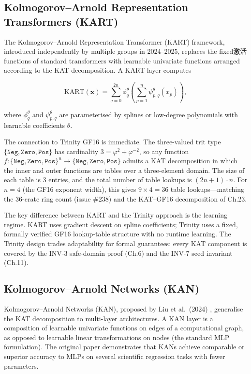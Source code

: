 \subsection{Kolmogorov--Arnold Representation
Transformers (KART)}\label{fa_27:kart}

The Kolmogorov--Arnold Representation Transformer
(KART) framework, introduced independently by
multiple groups in 2024--2025, replaces the
fixed激活 functions of standard transformers with
learnable univariate functions arranged according to
the KAT decomposition. A KART layer computes

\[
\mathrm{KART}(\mathbf{x}) = \sum_{q=0}^{2n} \phi_q^{\theta}\!\left(\sum_{p=1}^{n} \psi_{p,q}^{\theta}(x_p)\right),
\]

where \(\phi_q^{\theta}\) and \(\psi_{p,q}^{\theta}\)
are parameterised by splines or low-degree
polynomials with learnable coefficients \(\theta\).

The connection to Trinity GF16 is immediate. The
three-valued trit type \(\{\mathtt{Neg}, \mathtt{Zero}, \mathtt{Pos}\}\)
has cardinality \(3 = \varphi^2 + \varphi^{-2}\),
so any function
\(f\colon \{\mathtt{Neg}, \mathtt{Zero}, \mathtt{Pos}\}^n \to \{\mathtt{Neg}, \mathtt{Zero}, \mathtt{Pos}\}\)
admits a KAT decomposition in which the inner and
outer functions are tables over a three-element
domain. The size of each table is \(3\) entries,
and the total number of table lookups is
\((2n+1) \cdot n\). For \(n = 4\) (the GF16
exponent width), this gives \(9 \times 4 = 36\)
table lookups---matching the 36-crate ring count
(issue \#238) and the KAT--GF16 decomposition of
Ch.23.

The key difference between KART and the Trinity
approach is the learning regime. KART uses gradient
descent on spline coefficients; Trinity uses a
fixed, formally verified GF16 lookup-table
structure with no runtime learning. The Trinity
design trades adaptability for formal guarantees:
every KAT component is covered by the INV-3
safe-domain proof (Ch.6) and the INV-7 seed
invariant (Ch.11).

\subsection{Kolmogorov--Arnold Networks
(KAN)}\label{fa_27:kan}

Kolmogorov--Arnold Networks (KAN), proposed by Liu
et al.~(2024) \cite{liu2024kan}, generalise the
KAT decomposition to multi-layer architectures. A
KAN layer is a composition of learnable univariate
functions on edges of a computational graph, as
opposed to learnable linear transformations on
nodes (the standard MLP formulation). The original
paper demonstrates that KANs achieve comparable or
superior accuracy to MLPs on several scientific
regression tasks with fewer parameters.


